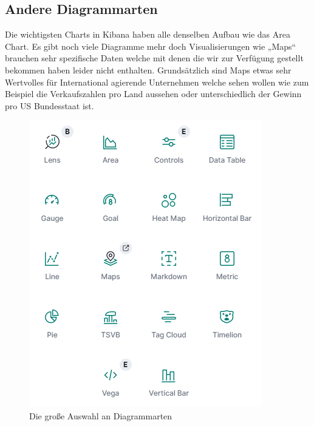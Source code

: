 \subsection{Andere Diagrammarten}
Die wichtigsten Charts in Kibana haben alle denselben Aufbau wie das Area Chart. Es gibt noch viele Diagramme mehr doch Visualisierungen wie „Maps“ brauchen sehr spezifische Daten welche mit denen die wir zur Verfügung gestellt bekommen haben leider nicht enthalten. Grundsätzlich sind Maps etwas sehr Wertvolles für International agierende Unternehmen welche sehen wollen wie zum Beispiel die Verkaufszahlen pro Land aussehen oder unterschiedlich der Gewinn pro US Bundesstaat ist. 
\begin{figure}[H]
    \centering
    \includegraphics{images/kibanaChartAuswahl.PNG}
    \caption{Die große Auswahl an Diagrammarten}
\end{figure}
